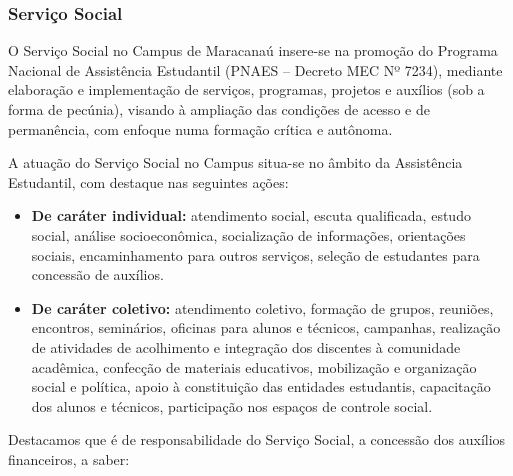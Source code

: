 \documentclass{paper}
\begin{document}
\subsubsection{Serviço Social}

O Serviço Social no Campus de Maracanaú insere-se na promoção do Programa Nacional de Assistência Estudantil (PNAES – Decreto MEC Nº 7234), mediante elaboração e implementação de serviços, programas, projetos e auxílios (sob a forma de pecúnia), visando à ampliação das condições de acesso e de permanência, com enfoque numa formação crítica e autônoma.

A atuação do Serviço Social no Campus situa-se no âmbito da Assistência Estudantil, com destaque nas seguintes ações:
 
\begin{itemize}
\item \textbf{De caráter individual:} atendimento social, escuta qualificada, estudo social, análise socioeconômica, socialização de informações, orientações sociais, encaminhamento para outros serviços, seleção de estudantes para concessão de auxílios.
\item \textbf{De caráter coletivo:} atendimento coletivo, formação de grupos, reuniões, encontros, seminários, oficinas para alunos e técnicos, campanhas, realização de atividades de acolhimento e integração dos discentes à comunidade acadêmica, confecção de materiais educativos, mobilização e organização social e política, apoio à constituição das entidades estudantis, capacitação dos alunos e técnicos, participação nos espaços de controle social.
\end{itemize}

Destacamos que é de responsabilidade do Serviço Social, a concessão dos auxílios financeiros, a saber: 
\end{document}
